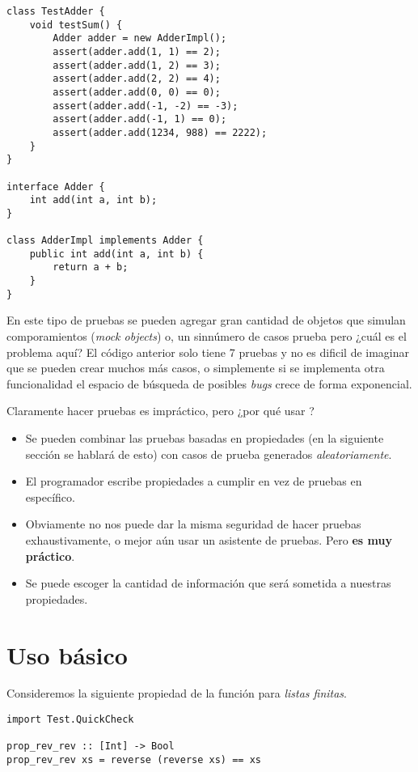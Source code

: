 \begin{verbatim}
class TestAdder {
    void testSum() {
        Adder adder = new AdderImpl();
        assert(adder.add(1, 1) == 2);
        assert(adder.add(1, 2) == 3);
        assert(adder.add(2, 2) == 4);
        assert(adder.add(0, 0) == 0);
        assert(adder.add(-1, -2) == -3);
        assert(adder.add(-1, 1) == 0);
        assert(adder.add(1234, 988) == 2222);
    }
}

interface Adder {
    int add(int a, int b);
}

class AdderImpl implements Adder {
    public int add(int a, int b) {
        return a + b;
    }
}
\end{verbatim}

En este tipo de pruebas se pueden agregar gran cantidad de objetos que simulan comporamientos 
(\textit{mock objects}) o, un sinnúmero de casos prueba pero ¿cuál es el problema aquí? El código
anterior solo tiene 7 pruebas y no es dificil de imaginar que se pueden crear muchos más casos, o
simplemente si se implementa otra funcionalidad el espacio de búsqueda de posibles \textit{bugs}
crece de forma exponencial.

Claramente hacer pruebas es impráctico, pero ¿por qué usar \QuickCheck?
\begin{itemize}
\item Se pueden combinar las pruebas basadas en propiedades (en la siguiente sección se hablará
de esto) con casos de prueba generados \textit{aleatoriamente}.
\item El programador escribe propiedades a cumplir en vez de pruebas en específico.
\item Obviamente no nos puede dar la misma seguridad de hacer pruebas exhaustivamente, o mejor
aún usar un asistente de pruebas. Pero \textbf{es muy práctico}.
\item Se puede escoger la cantidad de información que será sometida a nuestras propiedades.
\end{itemize}


\section{Uso básico}

Consideremos la siguiente propiedad de la función  para \textit{listas finitas}.
\begin{verbatim}
import Test.QuickCheck

prop_rev_rev :: [Int] -> Bool
prop_rev_rev xs = reverse (reverse xs) == xs
\end{verbatim}

